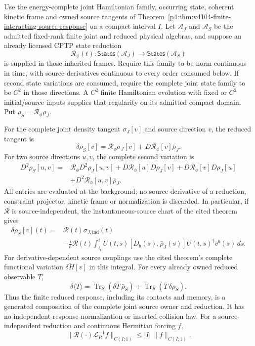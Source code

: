 \documentclass[12pt,a4paper]{article}
\begin{document}
\begin{corollary}
\label{p4:cor:finite-reduced-source-response}
Use the energy-complete joint Hamiltonian family, occurring state, coherent
kinetic frame and owned source tangents of
Theorem~\ref{p4:thm:v4104-finite-interacting-source-response} on a compact
interval $I$.  Let $\mathcal A_J$ and $\mathcal A_S$ be the admitted
fixed-rank finite joint and reduced physical algebras, and suppose an already
licensed CPTP state reduction
\[
 \mathcal R_\phi(t):\mathsf{States}(\mathcal A_J)
 \longrightarrow\mathsf{States}(\mathcal A_S)
\]
is supplied in those inherited frames.  Require this family to be
norm-continuous in time, with source derivatives continuous to every order
consumed below.  If second state variations are
consumed, require the complete joint state family to be $C^2$ in those
directions.  A $C^2$ finite Hamiltonian evolution with fixed or $C^2$
initial/source inputs supplies that regularity on its admitted compact
domain.  Put $\rho_S=\mathcal R_\phi\rho_J$.

For the complete joint density tangent $\sigma_J[v]$ and source direction
$v$, the reduced tangent is
\[
 \boxed{\delta\rho_S[v]
 =\mathcal R_\phi\sigma_J[v]
  +D\mathcal R_\phi[v]\bar\rho_J.}
\]
For two source directions $u,v$, the complete second variation is
\[
\begin{aligned}
 D^2\rho_S[u,v]={}&\mathcal R_\phi D^2\rho_J[u,v]
 +D\mathcal R_\phi[u]D\rho_J[v]
 +D\mathcal R_\phi[v]D\rho_J[u]\\
 &+D^2\mathcal R_\phi[u,v]\bar\rho_J .
\end{aligned}
\]
All entries are evaluated at the background; no source derivative of a
reduction, constraint projector, kinetic frame or normalization is discarded.
In particular, if $\mathcal R$ is source-independent, the instantaneous-source
chart of the cited theorem gives
\[
\begin{aligned}
 \delta\rho_S[v](t)={}&\mathcal R(t)\sigma_{J,\mathrm{ind}}(t)\\
 &-\frac{i}{\hbar}\mathcal R(t)\int_{t_i}^t
 U(t,s)[D_b(s),\bar\rho_J(s)]U(t,s)^\dagger v^b(s)\,ds .
\end{aligned}
\]
For derivative-dependent source couplings use the cited theorem's complete
functional variation $\delta\widetilde H[v]$ in this integral.  For every
already owned reduced observable $T$,
\[
 \delta\langle T\rangle
 =\operatorname{Tr}_S(\delta T\,\bar\rho_S)
  +\operatorname{Tr}_S(T\,\delta\rho_S).
\]
Thus the finite reduced response, including its contacts and memory, is a
generated composition of the complete joint source owner and reduction.
It has no independent response normalization or inserted collision law.
For a source-independent reduction and continuous Hermitian forcing $f$,
\[
 \|\mathcal R(\cdot)\mathscr L_R^{-1}f\|_{C(I;1)}
 \le |I|\,\|f\|_{C(I;1)}.
\]
\end{corollary}
\end{document}
